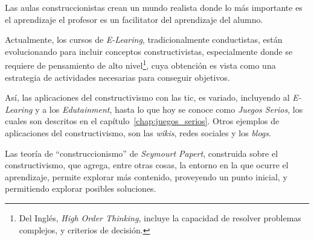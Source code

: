 Las aulas construccionistas crean un mundo realista donde lo más importante es
el aprendizaje el profesor es un facilitator del aprendizaje del
alumno\cite{johnson2005instructionism,nanjappa2003constructing}.

Actualmente, los cursos de \textit{E-Learing}, tradicionalmente conductistas,
están evolucionando para incluir conceptos
constructivistas\cite{weegar2012comparison}, especialmente donde se requiere de
pensamiento de alto nivel\footnote{Del Inglés, \textit{High Order Thinking},
    incluye la capacidad de resolver problemas complejos, y criterios de
    decisión.}, cuya obtención es vista como una estrategia de actividades
necesarias para conseguir objetivos\cite{miri2007purposely}.

Así, las aplicaciones del constructivismo con las \Gls{tic}, es variado,
incluyendo al \textit{E-Learing} y a los \textit{Edutainment}, hasta lo que hoy
se conoce como \textit{Juegos Serios}, los cuales son descritos en el
capítulo~\ref{chap:juegos_serios}. Otros ejemplos de aplicaciones del
constructivismo, son las \textit{wikis}, redes sociales y los
\textit{blogs}\cite{hernandez:constructivismo}.

Las teoría de \enquote{construccionismo} de \textit{Seymourt Papert},
construida sobre el constructivismo, que agrega, entre otras cosas, la
entorno en la que ocurre el aprendizaje\cite{egenfeldt2007third}, permite
explorar más contenido, proveyendo un punto inicial, y permitiendo explorar
posibles soluciones.
